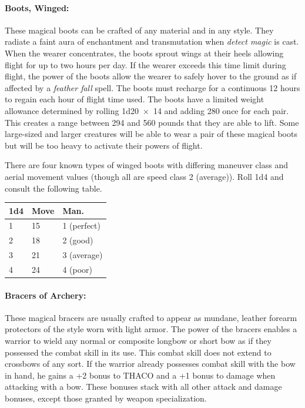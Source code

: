 \begin{multicols}{2}
\paragraph{Boots, Winged:} These magical boots can be crafted of any material and in any style.  They radiate a faint aura of enchantment and transmutation when \textit{detect magic} is cast.  When the wearer concentrates, the boots sprout wings at their heels allowing flight for up to two hours per day.  If the wearer exceeds this time limit during flight, the power of the boots allow the wearer to safely hover to the ground as if affected by a \textit{feather fall} spell.  The boots must recharge for a continuous 12 hours to regain each hour of flight time used.  The boots have a limited weight allowance determined by rolling 1d20~$\times$~14 and adding 280 once for each pair.  This creates a range between 294 and 560 pounds that they are able to lift.  Some large-sized and larger creatures will be able to wear a pair of these magical boots but will be too heavy to activate their powers of flight.

There are four known types of winged boots with differing maneuver class and aerial movement values (though all are speed class 2 (average)).  Roll 1d4 and consult the following table.

\noindent
\begin{tabular}{|p{}|p{}|p{}|}
\hline
1d4	& Move	& Man. \\
\hline\hline
\rowcolor[gray]{.9}1	& 15	& 1 (perfect) \\
2	& 18	& 2 (good) \\
\rowcolor[gray]{.9}3	& 21	& 3 (average) \\
4	& 24	& 4 (poor) \\
\hline
\end{tabular}

\paragraph{Bracers of Archery:} These magical bracers are usually crafted to appear as mundane, leather forearm protectors of the style worn with light armor.  The power of the bracers enables a warrior to wield any normal or composite longbow or short bow as if they possessed the combat skill in its use.  This combat skill does not extend to crossbows of any sort.  If the warrior already possesses combat skill with the bow in hand, he gains a +2 bonus to THACO and a +1 bonus to damage when attacking with a bow.  These bonuses stack with all other attack and damage bonuses, except those granted by weapon specialization.


\end{multicols}
